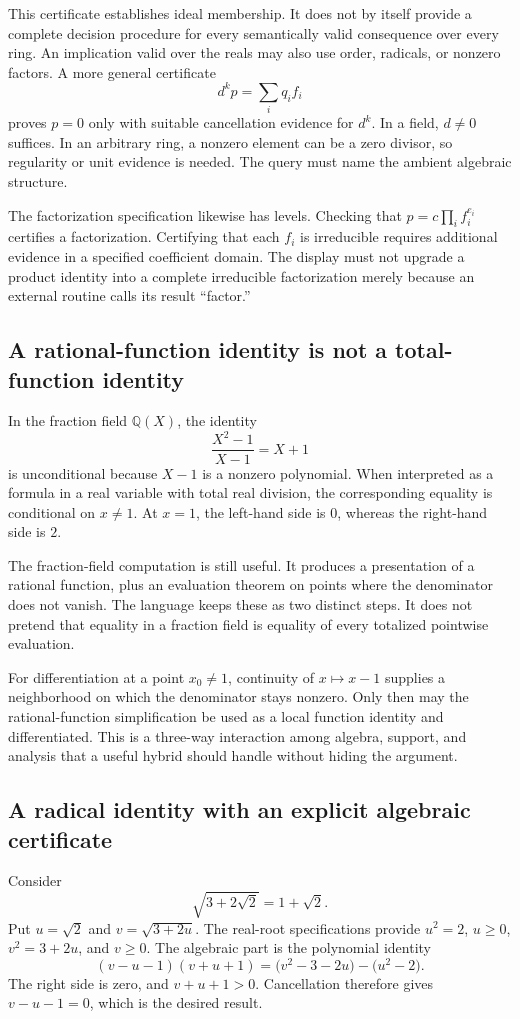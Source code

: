 \documentclass[11pt,a4paper]{article}
\newcommand{\Q}{\mathbb Q}
\theoremstyle{definition}
\begin{document}
This certificate establishes ideal membership. It does not by itself provide a
complete decision procedure for every semantically valid consequence over every
ring. An implication valid over the reals may also use order, radicals, or
nonzero factors. A more general certificate
\[
 d^k p=\sum_i q_i f_i
\]
proves \(p=0\) only with suitable cancellation evidence for \(d^k\). In a field,
\(d\neq0\) suffices. In an arbitrary ring, a nonzero element can be a zero
divisor, so regularity or unit evidence is needed. The query must name the
ambient algebraic structure.

The factorization specification likewise has levels. Checking that
\(p=c\prod_i f_i^{e_i}\) certifies a factorization. Certifying that each \(f_i\)
is irreducible requires additional evidence in a specified coefficient domain.
The display must not upgrade a product identity into a complete irreducible
factorization merely because an external routine calls its result ``factor.''

\subsection{A rational-function identity is not a total-function identity}
In the fraction field \(\Q(X)\), the identity
\[
 \frac{X^2-1}{X-1}=X+1
\]
is unconditional because \(X-1\) is a nonzero polynomial. When interpreted as a
formula in a real variable with total real division, the corresponding equality
is conditional on \(x\neq1\). At \(x=1\), the left-hand side is \(0\), whereas
the right-hand side is \(2\).

The fraction-field computation is still useful. It produces a presentation of a
rational function, plus an evaluation theorem on points where the denominator
does not vanish. The language keeps these as two distinct steps. It does not
pretend that equality in a fraction field is equality of every totalized
pointwise evaluation.

For differentiation at a point \(x_0\neq1\), continuity of \(x\mapsto x-1\)
supplies a neighborhood on which the denominator stays nonzero. Only then may
the rational-function simplification be used as a local function identity and
differentiated. This is a three-way interaction among algebra, support, and
analysis that a useful hybrid should handle without hiding the argument.

\subsection{A radical identity with an explicit algebraic certificate}
Consider
\[
 \sqrt{3+2\sqrt2}=1+\sqrt2.
\]
Put \(u=\sqrt2\) and \(v=\sqrt{3+2u}\). The real-root specifications provide
\(u^2=2\), \(u\geq0\), \(v^2=3+2u\), and \(v\geq0\). The algebraic part is the
polynomial identity
\begin{equation}\label{eq:denestcert}
 (v-u-1)(v+u+1)
   =\bigl(v^2-3-2u\bigr)-\bigl(u^2-2\bigr).
\end{equation}
The right side is zero, and \(v+u+1>0\). Cancellation therefore gives
\(v-u-1=0\), which is the desired result.
\end{document}
